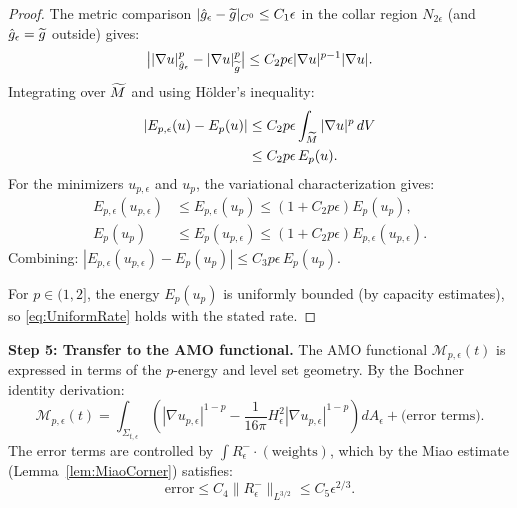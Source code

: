 \begin{proof} The metric comparison $|\hat{g}_\epsilon - \widetilde{g}|_{C^0} \le C_1 \epsilon$ in the collar region $N_{2\epsilon}$ (and $\hat{g}_\epsilon = \widetilde{g}$ outside) gives:
\begin{equation}
    \big| |\nabla u|_{\hat{g}_\epsilon}^p - |\nabla u|_{\widetilde{g}}^p \big| \le C_2 p \epsilon |\nabla u|^{p-1} |\nabla u|.
\end{equation}
Integrating over $\widetilde{M}$ and using H\"older's inequality:
\begin{align}
    |E_{p,\epsilon}(u) - E_p(u)| &\le C_2 p \epsilon \int_{\widetilde{M}} |\nabla u|^p \, dV \\
    &\le C_2 p \epsilon \, E_p(u).
\end{align}
For the minimizers $u_{p,\epsilon}$ and $u_p$, the variational characterization gives:
\begin{align}
    E_{p,\epsilon}(u_{p,\epsilon}) &\le E_{p,\epsilon}(u_p) \le (1 + C_2 p \epsilon) E_p(u_p), \\
    E_p(u_p) &\le E_p(u_{p,\epsilon}) \le (1 + C_2 p \epsilon) E_{p,\epsilon}(u_{p,\epsilon}).
\end{align}
Combining: $|E_{p,\epsilon}(u_{p,\epsilon}) - E_p(u_p)| \le C_3 p \epsilon \, E_p(u_p)$.

For $p \in (1, 2]$, the energy $E_p(u_p)$ is uniformly bounded (by capacity estimates), so \eqref{eq:UniformRate} holds with the stated rate.
\end{proof}

\textbf{Step 5: Transfer to the AMO functional.}
The AMO functional $\mathcal{M}_{p,\epsilon}(t)$ is expressed in terms of the $p$-energy and level set geometry. By the Bochner identity derivation:
\begin{equation}
    \mathcal{M}_{p,\epsilon}(t) = \int_{\Sigma_{t,\epsilon}} \left( |\nabla u_{p,\epsilon}|^{1-p} - \frac{1}{16\pi} H_\epsilon^2 |\nabla u_{p,\epsilon}|^{1-p} \right) dA_\epsilon + \text{(error terms)}.
\end{equation}
The error terms are controlled by $\int R^-_\epsilon \cdot (\text{weights})$, which by the Miao estimate (Lemma~\ref{lem:MiaoCorner}) satisfies:
\begin{equation}
    \text{error} \le C_4 \|R^-_\epsilon\|_{L^{3/2}} \le C_5 \epsilon^{2/3}.
\end{equation}

